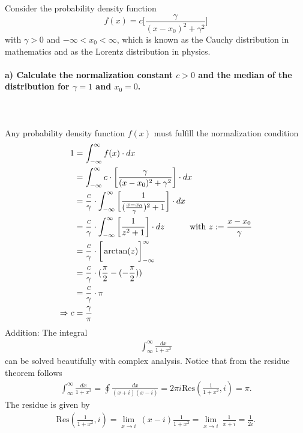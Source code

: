 Consider the probability density function
\begin{equation}
    f(x)=c\bigg[\frac{\gamma}{(x-x_0)^2+\gamma^2}\bigg]
\end{equation}
with $\gamma>0$ and $-\infty<x_0<\infty$, which is known as the 
Cauchy distribution in mathematics and as the Lorentz distribution
in physics.

\paragraph{a) Calculate the normalization constant $c>0$ and the median
    of the distribution for $\gamma=1$ and $x_0=0$.
} \ \\
\\
    Any probability density function $f(x)$ must fulfill the normalization 
    condition
    \begin{align}
        1
        &=\int_{-\infty}^\infty f(x)\cdot dx \\
        &=\int_{-\infty}^\infty c\cdot\bigg[
            \frac{\gamma}{(x-x_0)^2+\gamma^2}
        \bigg]\cdot dx \\
        &=\frac{c}{\gamma}\cdot\int_{-\infty}^\infty \bigg[
            \frac{1}{(\frac{x-x_0}{\gamma})^2+1}
        \bigg]\cdot dx \\
        &=\frac{c}{\gamma}\cdot\int_{-\infty}^\infty \bigg[
            \frac{1}{z^2+1}
        \bigg]\cdot dz\ \ \ \ \ \ \ \ \ 
        \textnormal{with } z:=\frac{x-x_0}{\gamma} \\
        &=\frac{c}{\gamma}\cdot\bigg[\arctan(z)\bigg]^{\infty}_{-\infty} \\
        &=\frac{c}{\gamma}\cdot(\frac{\pi}{2}-(-\frac{\pi}{2})) \\
        &=\frac{c}{\gamma}\cdot\pi \\
        \Rightarrow c&=\frac{\gamma}{\pi}
    \end{align}
    Addition: The integral 
    \begin{align}
    \int_{\infty}^{\infty} \frac{dx}{1+x^2}
    \end{align}
    can be solved beautifully with complex analysis. Notice that from the residue theorem follows
    \begin{align}
    \int_{\infty}^{\infty} \frac{dx}{1+x^2} = \oint \frac{dx}{(x+i)(x-i)} = 2\pi i \text{Res}\left( \frac{1}{1+x^2} , i \right) = \pi.
    \end{align}
    The residue is given by
    \begin{align}
    \text{Res}\left( \frac{1}{1+x^2} , i \right) = \lim_{x \rightarrow i} \ (x - i) \frac{1}{1+x^2} = \lim_{x \rightarrow i} \ \frac{1}{x+i} = \frac{1}{2i}.
    \end{align}
